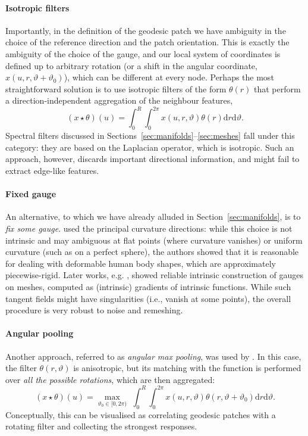 \paragraph{Isotropic filters}
Importantly, in the definition of the geodesic patch we have ambiguity in the choice of the reference direction and the patch orientation. This is exactly the ambiguity of the choice of the gauge, and our local system of coordinates is defined up to arbitrary rotation (or a shift in the angular coordinate, $x(u,r,\vartheta+\vartheta_0)$), which can be different at every node. 
%
Perhaps the most straightforward solution is to use isotropic filters of the form $\theta(r)$ that perform a direction-independent aggregation of the neighbour features,  
$$
(x\star \theta)(u) = \int_0^R \int_0^{2\pi} x(u,r,\vartheta) \theta(r) \mathrm{d}r \mathrm{d}\vartheta.
$$
Spectral filters discussed in Sections~\ref{sec:manifolds}--\ref{sec:meshes} fall under this category: they are based on the Laplacian operator, which is isotropic. 
%
Such an approach, however, discards important directional information, and might fail to extract edge-like features.  


\paragraph{Fixed gauge}
An alternative, to which we have already alluded in Section~\ref{sec:manifolds}, is to {\em fix some gauge}.  \cite{monti2017geometric} used the principal curvature directions: while this choice is not intrinsic and may ambiguous at flat points (where curvature vanishes) or uniform curvature (such as on a perfect sphere), the authors 
showed that it is reasonable for dealing with deformable human body shapes, which are approximately piecewise-rigid. 
%
Later works, e.g. \cite{melzi2019gframes}, showed reliable intrinsic construction of gauges on meshes, computed as  (intrinsic) gradients of intrinsic functions. While such tangent fields might have singularities (i.e., vanish at some points), the overall procedure is very robust to noise and remeshing.  


\paragraph{Angular pooling}
Another approach, referred to as {\em angular max pooling}, was used by \cite{masci2015geodesic}. In this case, the filter $\theta(r,\vartheta)$ is anisotropic, but its matching with the function is performed over {\em all the possible rotations}, which are then aggregated:
$$
(x\star \theta)(u) = \max_{\vartheta_0 \in [0,2\pi) } \,\, \int_0^R \int_0^{2\pi} x(u,r,\vartheta) \theta(r,\vartheta+\vartheta_0) \mathrm{d}r \mathrm{d}\vartheta.
$$
Conceptually, this can be visualised as correlating geodesic patches with a rotating filter and collecting the strongest responses. 



